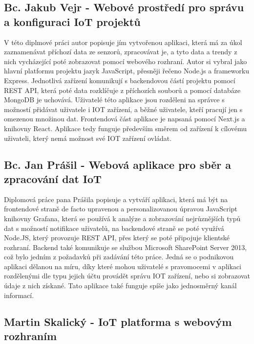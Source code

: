 \subsection{Bc. Jakub Vejr - Webové prostředí pro správu a konfiguraci IoT projektů}

V této diplmové práci autor popisuje jím vytvořenou aplikaci, která má za úkol zaznamenávat příchozí data ze senzorů, zpracovávat je, a tyto data a trendy z nich vycházející poté zobrazovat pomocí webového rozhraní. Autor si vybral jako hlavní platformu projektu jazyk JavaScript, přesněji řečeno Node.js a frameworku Express. Jednotlivá zařízení komunikují s backendovou částí projektu pomocí REST API, která poté data rozklíčuje z příchozích souborů a pomocí databáze MongoDB je uchovává. Uživatelé této aplikace jsou rozděleni na správce s možností přidávat uživatele i IOT zařízení, a běžné uživatele, kteří pracují jen s omezenou množinou dat. Frontendová část aplikace je napsaná pomocí Next.js a knihovny React. Aplikace tedy funguje především směrem od zařízení k cílovému uživateli, který nemá možnost své IOT zařízení ovládat. 

\subsection{Bc. Jan Prášil - Webová aplikace pro sběr a zpracování dat IoT}

Diplomová práce pana Prášila popisuje a vytváří aplikaci, která má být na frontendové straně de facto upravenou a personalizovanou úpravou JavaScript knihovny Grafana, která se používá k analýze a zobrazování nejrůznějších typů dat s možností notifikace uživatelů, na backendové straně se poté využívá Node.JS, který provozuje REST API, přes který se poté připojuje klientské rozhraní. Backend také komunikuje se službou Microsoft SharePoint Server 2013, což bylo jedním z požadavků při zadávání této práce. Jedná se o podnikovou aplikaci dělanou na míru, díky které mohou uživatelé s pravomocemi v aplikaci rozdělenými dle typu jejich účtu provádět správu IOT zařízení, nebo si zobrazovat údaje z nich získané. Tato aplikace také funguje spíše jako jednosměrný kanál informací.

\subsection{Martin Skalický - IoT platforma s webovým rozhraním}



